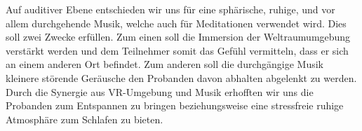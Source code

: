 Auf auditiver Ebene entschieden wir uns für eine sphärische, ruhige, und vor allem durchgehende Musik, welche auch für Meditationen verwendet wird. Dies soll zwei Zwecke erfüllen. Zum einen soll die Immersion der Weltraumumgebung verstärkt werden und dem Teilnehmer somit das Gefühl vermitteln, dass er sich an einem anderen Ort befindet. Zum anderen soll die durchgängige Musik kleinere störende Geräusche den Probanden davon abhalten abgelenkt zu werden.
Durch die Synergie aus VR-Umgebung und Musik erhofften wir uns die Probanden zum Entspannen zu bringen beziehungsweise eine stressfreie ruhige Atmosphäre zum Schlafen zu bieten.
